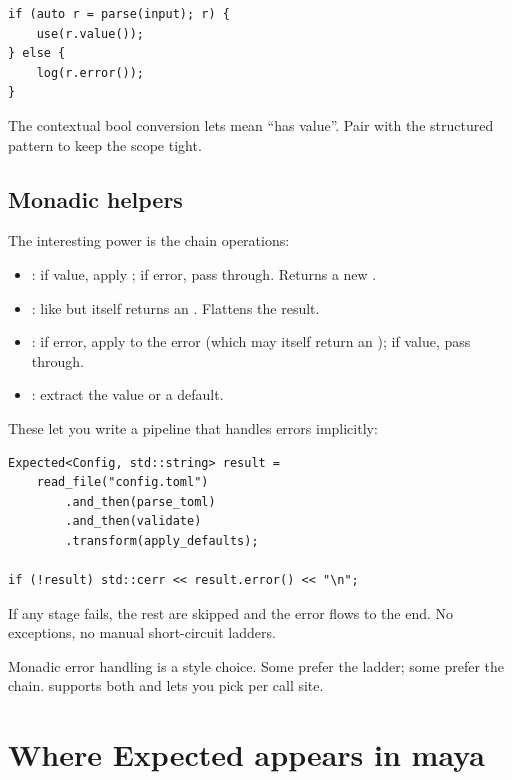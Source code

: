\begin{lstlisting}
if (auto r = parse(input); r) {
    use(r.value());
} else {
    log(r.error());
}
\end{lstlisting}

The contextual bool conversion lets  mean ``has
value''. Pair with the structured 
pattern to keep the scope tight.

\subsection*{Monadic helpers}

The interesting power is the chain operations:

\begin{itemize}[leftmargin=*]
  \item {}: if value, apply ; if error,
    pass through. Returns a new .
  \item {}: like  but 
    itself returns an . Flattens the result.
  \item {}: if error, apply  to the error
    (which may itself return an ); if value, pass
    through.
  \item {}: extract the value or a default.
\end{itemize}

These let you write a pipeline that handles errors implicitly:

\begin{lstlisting}
Expected<Config, std::string> result =
    read_file("config.toml")
        .and_then(parse_toml)
        .and_then(validate)
        .transform(apply_defaults);

if (!result) std::cerr << result.error() << "\n";
\end{lstlisting}

If any stage fails, the rest are skipped and the error flows to
the end. No exceptions, no manual short-circuit ladders.

\begin{idea}
Monadic error handling is a style choice. Some prefer the
ladder; some prefer the chain.  supports both
and lets you pick per call site.
\end{idea}

\section{Where Expected appears in maya}

